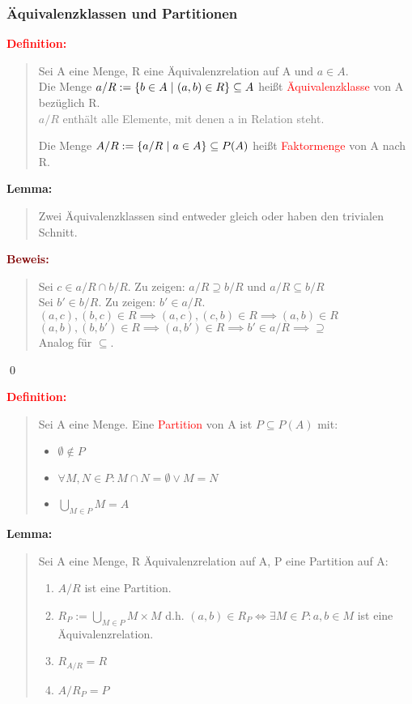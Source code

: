 \documentclass{article}
\newcommand{\smsp}{\phantom{\hspace{3px}}}
\newcommand{\red}[1]{\textcolor{red}{#1}}
\newcommand{\gray}[1]{\textcolor{gray}{#1}}
\newcommand{\dgr}[1]{\textcolor{dgr}{#1}}
\newcommand{\maroon}[1]{\textcolor{maroon}{#1}}
\newcommand{\de}[1]{\red{\textbf{Definition: }}\begin{quote}#1\end{quote}}
\newcommand{\lem}[1]{\dgr{\textbf{Lemma: }}\begin{quote}#1\end{quote}}
\newcommand{\pr}[1]{\maroon{\textbf{Beweis: }}\begin{quote}#1\end{quote}\qed}
\renewcommand{\st}{\smsp | \smsp}
\begin{document}
\subsubsection{Äquivalenzklassen und Partitionen}

\de{
    Sei A eine Menge, R eine Äquivalenzrelation auf A und $a \in A$.\\
    Die Menge $a/R := \{b \in A \st (a,b) \in R\} \subseteq A$ heißt \red{Äquivalenzklasse} von A bezüglich R.\\
    \gray{$a/R$ enthält alle Elemente, mit denen a in Relation steht.}

    Die Menge $A/R := \{a/R \st a \in A\} \subseteq P(A)$ heißt \red{Faktormenge} von A nach R.
}

\lem{
    Zwei Äquivalenzklassen sind entweder gleich oder haben den trivialen Schnitt.
}

\pr{
    Sei $c \in a/R \cap b/R$. Zu zeigen: $a/R \supseteq b/R$ und $a/R \subseteq b/R$\\
    Sei $b' \in b/R$. Zu zeigen: $b' \in a/R$.\\
    $(a,c),(b,c) \in R \implies (a,c),(c,b) \in R \implies (a,b) \in R$\\
    $(a,b), (b,b') \in R \implies (a,b') \in R \implies b' \in a/R \implies \supseteq$\\
    Analog für $\subseteq$.
}

\de{
    Sei A eine Menge. Eine \red{Partition} von A ist $P \subseteq P(A)$ mit:
    \begin{itemize}
        \item $\emptyset \notin P$
        \item $\forall M,N \in P: M \cap N = \emptyset \lor M = N$
        \item $\bigcup_{M \in P}M = A$
    \end{itemize}
}

\newpage
\lem{
    Sei A eine Menge, R Äquivalenzrelation auf A, P eine Partition auf A:
    \begin{enumerate}
        \item $A/R$ ist eine Partition.
        \item $R_P := \bigcup_{M \in P} M \times M$ d.h. $(a,b) \in R_P \iff \exists M \in P: a,b \in M$ ist eine Äquivalenzrelation.
        \item $R_{A/R} = R$
        \item $A/R_P = P$
    \end{enumerate}
}
\end{document}
